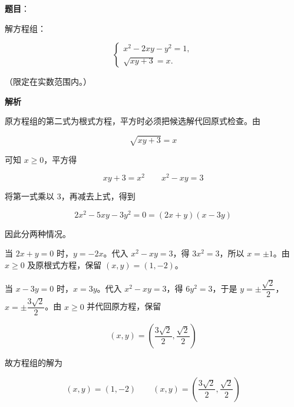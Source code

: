 \begin{answer}

\textbf{题目}：

解方程组：

\nopagebreak[4]
\[
\begin{cases}
x^2-2xy-y^2=1,\\[2pt]
\sqrt{xy+3}=x.
\end{cases}
\]

（限定在实数范围内。）

\textbf{解析}

原方程组的第二式为根式方程，平方时必须把候选解代回原式检查。由

\nopagebreak[4]
\[
\sqrt{xy+3}=x
\]

可知 $x\geq0$，平方得

\nopagebreak[4]
\[
xy+3=x^2
\qquad x^2-xy=3
\]

将第一式乘以 $3$，再减去上式，得到

\nopagebreak[4]
\[
2x^2-5xy-3y^2=0
= (2x+y)(x-3y)
\]

因此分两种情况。

当 $2x+y=0$ 时，$y=-2x$。代入 $x^2-xy=3$，得 $3x^2=3$，所以 $x=\pm1$。由 $x\geq0$ 及原根式方程，保留 $(x,y)=(1,-2)$。

当 $x-3y=0$ 时，$x=3y$。代入 $x^2-xy=3$，得 $6y^2=3$，于是 $y=\pm\dfrac{\sqrt2}{2}$，$x=\pm\dfrac{3\sqrt2}{2}$。由 $x\geq0$ 并代回原方程，保留

\nopagebreak[4]
\[
\left(x,y\right)=\left(\frac{3\sqrt2}{2},\frac{\sqrt2}{2}\right)
\]

故方程组的解为

\nopagebreak[4]
\[
(x,y)=(1,-2)\qquad
\left(x,y\right)=\left(\frac{3\sqrt2}{2},\frac{\sqrt2}{2}\right)
\]


\end{answer}
